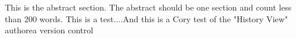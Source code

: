 This is the abstract section. The abstract should be one section and count less than 200 words. This is a test....And this is a Cory test of the "History View" authorea version control